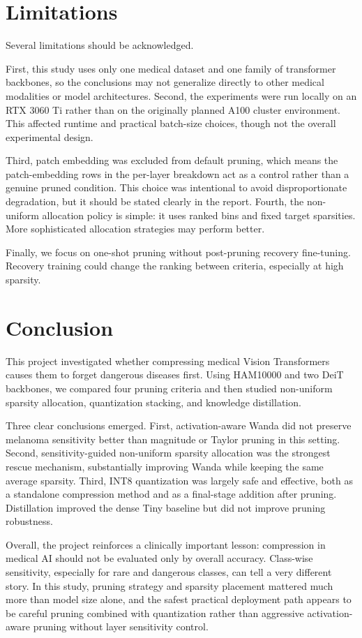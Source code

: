 \documentclass[11pt]{article}
\begin{document}
\section{Limitations}
Several limitations should be acknowledged.

First, this study uses only one medical dataset and one family of transformer backbones, so the conclusions may not generalize directly to other medical modalities or model architectures. Second, the experiments were run locally on an RTX 3060 Ti rather than on the originally planned A100 cluster environment. This affected runtime and practical batch-size choices, though not the overall experimental design.

Third, patch embedding was excluded from default pruning, which means the patch-embedding rows in the per-layer breakdown act as a control rather than a genuine pruned condition. This choice was intentional to avoid disproportionate degradation, but it should be stated clearly in the report. Fourth, the non-uniform allocation policy is simple: it uses ranked bins and fixed target sparsities. More sophisticated allocation strategies may perform better.

Finally, we focus on one-shot pruning without post-pruning recovery fine-tuning. Recovery training could change the ranking between criteria, especially at high sparsity.

\section{Conclusion}
This project investigated whether compressing medical Vision Transformers causes them to forget dangerous diseases first. Using HAM10000 and two DeiT backbones, we compared four pruning criteria and then studied non-uniform sparsity allocation, quantization stacking, and knowledge distillation.

Three clear conclusions emerged. First, activation-aware Wanda did not preserve melanoma sensitivity better than magnitude or Taylor pruning in this setting. Second, sensitivity-guided non-uniform sparsity allocation was the strongest rescue mechanism, substantially improving Wanda while keeping the same average sparsity. Third, INT8 quantization was largely safe and effective, both as a standalone compression method and as a final-stage addition after pruning. Distillation improved the dense Tiny baseline but did not improve pruning robustness.

Overall, the project reinforces a clinically important lesson: compression in medical AI should not be evaluated only by overall accuracy. Class-wise sensitivity, especially for rare and dangerous classes, can tell a very different story. In this study, pruning strategy and sparsity placement mattered much more than model size alone, and the safest practical deployment path appears to be careful pruning combined with quantization rather than aggressive activation-aware pruning without layer sensitivity control.
\end{document}
